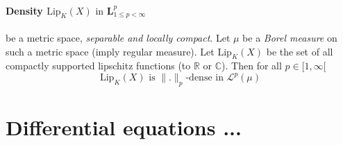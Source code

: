 \documentclass[a4paper,10pt]{article}
\begin{document}
\paragraph{Density $\text{Lip}_K(X) \text{ in } \textbf{L}^p_{1 \leq p < \infty}$} be a metric space, \textit{separable and locally compact}. Let $\mu$ be a \textit{Borel measure} on such a metric space (imply regular measure). Let $\text{Lip}_{K}(X)$ be the set of all compactly supported lipschitz functions (to $\mathbb{R} \text{ or } \mathbb{C} $). Then for all $ p \in [1, \infty[ $
\[
\text{Lip}_{K}(X) \text{ is } \|.\|_p \text{-dense in }  \mathcal{L}^p(\mu)
\]




\section{Differential equations ...}%
\end{document}
